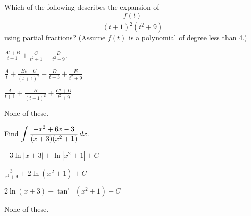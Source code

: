 \documentclass[12pt]{exam}
\newcommand{\ds}{\ensuremath{\displaystyle}}
\newcommand{\<}{(}
\renewcommand{\>}{)}
\begin{document}
\begin{center}
\end{center}
\vspace{0.1in}

\vspace{12pt}

\begin{questions}\setcounter{question}{8}

\question
Which of the following describes the expansion of
\[\frac{f(t)}{(t+1)^2(t^2+9)}\] using partial fractions?
(Assume \(f(t)\) is a polynomial of degree less than 4.)
\begin{choices}
\item \(\frac{At+B}{t+1}+\frac{C}{t^2+1}+\frac{D}{t^2+9}\).
\item \(\frac{A}{t}+\frac{Bt+C}{(t+1)^2}+\frac{D}{t+3}+\frac{E}{t^2+9}\)
\item \(\frac{A}{t+1}+\frac{B}{(t+1)^2}+\frac{Ct+D}{t^2+9}\)
\item None of these.
\end{choices}

\question
Find \(\ds\int \frac{-x^2+6x-3}{(x+3)(x^2+1)}\,dx\).
\begin{choices}
\item \(-3\ln|x+3|+\ln|x^2+1|+C\)
\item \(\frac{3}{x^2+9}+2\ln(x^2+1)+C\)
\item \(2\ln(x+3)-\tan^{\leftarrow}(x^2+1)+C\)
\item None of these.
\end{choices}



\end{questions}
\end{document}
